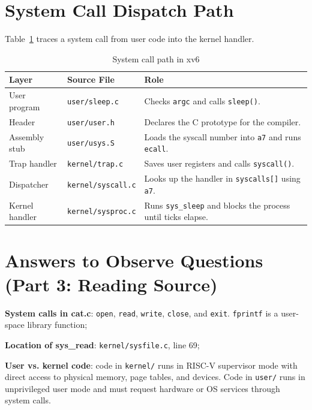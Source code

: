 \documentclass{assets/utmreport}
\begin{document}
\section{System Call Dispatch Path}
Table~\ref{tab:l2_dispatch} traces a system call from user code into the kernel handler.

\begin{table}[H]
\caption{System call path in xv6}
\label{tab:l2_dispatch}
\centering
\small
\begin{tabularx}{\textwidth}{|l|p{4.0cm}|X|}
\hline
\textbf{Layer} & \textbf{Source File} & \textbf{Role} \\
\hline
User program & \texttt{user/sleep.c} & Checks \texttt{argc} and calls \texttt{sleep()}. \\
\hline
Header & \texttt{user/user.h} & Declares the C prototype for the compiler. \\
\hline
Assembly stub & \texttt{user/usys.S} & Loads the syscall number into \texttt{a7} and runs \texttt{ecall}. \\
\hline
Trap handler & \texttt{kernel/trap.c} & Saves user registers and calls \texttt{syscall()}. \\
\hline
Dispatcher & \texttt{kernel/syscall.c} & Looks up the handler in \texttt{syscalls[]} using \texttt{a7}. \\
\hline
Kernel handler & \texttt{kernel/sysproc.c} & Runs \texttt{sys\_sleep} and blocks the process until ticks elapse. \\
\hline
\end{tabularx}
\end{table}

\section{Answers to Observe Questions (Part 3: Reading Source)}
\begin{utmenumerate}
\item \textbf{System calls in cat.c}: \texttt{open}, \texttt{read}, \texttt{write}, \texttt{close}, and \texttt{exit}. \texttt{fprintf} is a user-space library function;
\item \textbf{Location of sys\_read}: \texttt{kernel/sysfile.c}, line 69;
\item \textbf{User vs. kernel code}: code in \texttt{kernel/} runs in RISC-V supervisor mode with direct access to physical memory, page tables, and devices. Code in \texttt{user/} runs in unprivileged user mode and must request hardware or OS services through system calls.
\end{utmenumerate}
\end{document}
